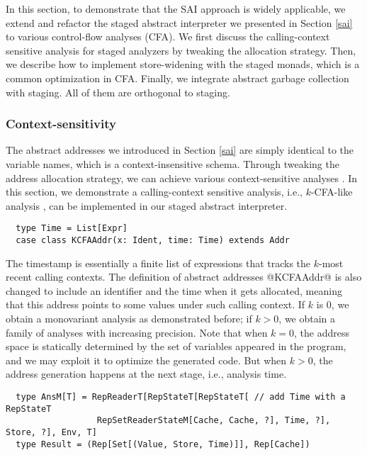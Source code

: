 In this section, to demonstrate that the SAI approach is widely applicable, we
extend and refactor the staged abstract interpreter we presented in Section
\ref{sai} to various control-flow analyses (CFA). We first discuss the
calling-context sensitive analysis for staged analyzers by tweaking the
allocation strategy. Then, we describe how to implement store-widening with the
staged monads, which is a common optimization in CFA. Finally, we integrate
abstract garbage collection with staging. All of them are orthogonal to
staging.

\subsubsection{Context-sensitivity}

The abstract addresses we introduced in Section \ref{sai} are simply identical
to the variable names, which is a context-insensitive schema.  Through tweaking
the address allocation strategy, we can achieve various context-sensitive
analyses \cite{DBLP:conf/icfp/Gilray0M16}. In this section, we demonstrate a
calling-context sensitive analysis, i.e., $k$-CFA-like analysis
\cite{DBLP:journals/jfp/HornM12}, can be implemented in our staged abstract
interpreter.
\begin{lstlisting}
  type Time = List[Expr]
  case class KCFAAddr(x: Ident, time: Time) extends Addr
\end{lstlisting}

The timestamp is essentially a finite list of expressions that tracks the $k$-most
recent calling contexts. The definition of abstract addresses @KCFAAddr@ is also
changed to include an identifier and the time when it gets allocated, meaning that
this address points to some values under such calling context. If $k$ is 0, we
obtain a monovariant analysis as demonstrated before; if $k > 0$, we obtain a
family of analyses with increasing precision. Note that when $k = 0$, the
address space is statically determined by the set of variables appeared in the
program, and we may exploit it to optimize the generated code. But when $k > 0$,
the address generation happens at the next stage, i.e., analysis time.
\begin{lstlisting}
  type AnsM[T] = RepReaderT[RepStateT[RepStateT[ // add Time with a RepStateT
                  RepSetReaderStateM[Cache, Cache, ?], Time, ?], Store, ?], Env, T]
  type Result = (Rep[Set[(Value, Store, Time)]], Rep[Cache])
\end{lstlisting}

